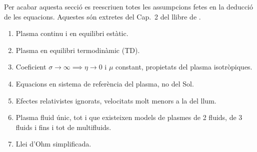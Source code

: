 Per acabar aquesta secció es reescriuen totes les assumpcions fetes en la deducció de les equacions.
Aquestes són extretes del Cap.~2 del llibre de \textcite{Priest_2014}.
\begin{enumerate}[label=\Roman*.]
	\item \label{punt:I} Plasma continu i en equilibri estàtic.
	\item \label{punt:II} Plasma en equilibri termodinàmic (TD).
	\item \label{punt:III} Coeficient $\sigma \rightarrow \infty \implies \eta \rightarrow 0$ i $\mu$ constant, propietats del plasma isotròpiques.
	\item \label{punt:IV} Equacions en sistema de referència del plasma, no del Sol.
	\item \label{punt:V} Efectes relativistes ignorats, velocitats molt menors a la del llum.
	\item \label{punt:VI} Plasma fluid únic, tot i que existeixen models de plasmes de 2 fluids, de 3 fluids i fins i tot de multifluids.
	\item \label{punt:VII} Llei d'Ohm simplificada.
\end{enumerate}